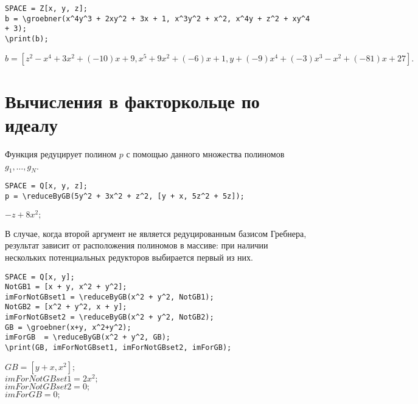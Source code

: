 \begin{verbatim}
SPACE = Z[x, y, z];
b = \groebner(x^4y^3 + 2xy^2 + 3x + 1, x^3y^2 + x^2, x^4y + z^2 + xy^4 + 3);  
\print(b);
\end{verbatim}

{$b = [z^2-x^4+3x^2+(-10)x+9, x^5+9x^2+(-6)x+1, y+(-9)x^4+(-3)x^3-x^2+(-81)x+27]. $}

\section{Вычисления в факторкольце по идеалу}

Функция  редуцирует полином
$p$ с помощью данного множества полиномов $g_1, \ldots, g_N$.

\begin{verbatim}
SPACE = Q[x, y, z];
p = \reduceByGB(5y^2 + 3x^2 + z^2, [y + x, 5z^2 + 5z]);
\end{verbatim}

{$-z+8x^2;$}

В случае, когда второй аргумент не является редуцированным базисом
Гребнера, результат зависит от расположения полиномов в массиве: 
при наличии нескольких потенциальных редукторов выбирается первый из них.

\begin{verbatim}
SPACE = Q[x, y];
NotGB1 = [x + y, x^2 + y^2];
imForNotGBset1 = \reduceByGB(x^2 + y^2, NotGB1);
NotGB2 = [x^2 + y^2, x + y];
imForNotGBset2 = \reduceByGB(x^2 + y^2, NotGB2);
GB = \groebner(x+y, x^2+y^2);  
imForGB  = \reduceByGB(x^2 + y^2, GB);
\print(GB, imForNotGBset1, imForNotGBset2, imForGB);
\end{verbatim}

 {
$GB = [y+x, x^2];$\\
$imForNotGBset1 = 2x^2;$\\
$imForNotGBset2 = 0;$\\
$imForGB = 0;$
}

